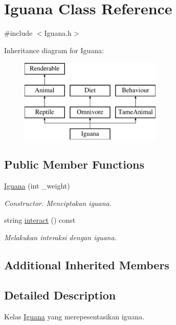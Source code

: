 \hypertarget{classIguana}{\section{Iguana Class Reference}
\label{classIguana}
}


{\ttfamily \#include $<$Iguana.\+h$>$}

Inheritance diagram for Iguana\+:\begin{figure}[H]
\begin{center}
\leavevmode
\includegraphics[height=4.000000cm]{classIguana}
\end{center}
\end{figure}
\subsection*{Public Member Functions}
\begin{DoxyCompactItemize}
\item 
\hypertarget{classIguana_a009dd4f985d9b6c32ce1283ba4f12e7c}{\hyperlink{classIguana_a009dd4f985d9b6c32ce1283ba4f12e7c}{Iguana} (int \+\_\+weight)}\label{classIguana_a009dd4f985d9b6c32ce1283ba4f12e7c}

\begin{DoxyCompactList}\small\item\em Constructor. Menciptakan iguana. \end{DoxyCompactList}\item 
string \hyperlink{classIguana_a2787eee87f7b90e905de0bf75012cb18}{interact} () const 
\begin{DoxyCompactList}\small\item\em Melakukan interaksi dengan iguana. \end{DoxyCompactList}\end{DoxyCompactItemize}
\subsection*{Additional Inherited Members}


\subsection{Detailed Description}
Kelas \hyperlink{classIguana}{Iguana} yang merepesentasikan iguana. 

